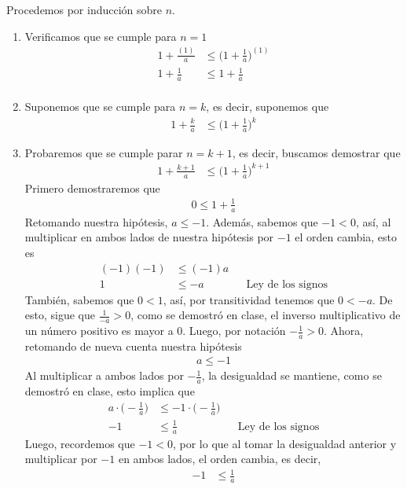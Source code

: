 \documentclass[11pt]{article}
\begin{document}
\begin{enumerate}
Procedemos por inducción sobre $n$. \begin{enumerate}[label=\roman*)]
 \item Verificamos que se cumple para $n=1$ \begin{align*}
  1+\frac{(1)}{a} &\leq \biggl(1+\frac{1}{a}\biggr)^{(1)} \\
  1+\frac{1}{a} &\leq 1+\frac{1}{a} \\
 \end{align*}
 \item Suponemos que se cumple para $n=k$, es decir, suponemos que \begin{align*}
  1+\frac{k}{a} &\leq \biggl(1+\frac{1}{a}\biggr)^k
 \end{align*}
 \item Probaremos que se cumple parar $n=k+1$, es decir, buscamos demostrar que \begin{align*}
  1+\frac{k+1}{a} &\leq \biggl(1+\frac{1}{a}\biggr)^{k+1}
 \end{align*}
 Primero demostraremos que \begin{align*}
  0 \leq 1+ \frac{1}{a}
 \end{align*} Retomando nuestra hipótesis, $a\leq -1$. Además, sabemos que $-1<0$, así, al multiplicar en ambos lados de nuestra hipótesis	por $-1$ el orden cambia, esto es \begin{align*}
  (-1)(-1) &\leq (-1) a \\
  1 &\leq -a && \text{Ley de los signos}
 \end{align*} También, sabemos que $0<1$, así, por transitividad tenemos que $0<-a$. De esto, sigue que $\frac{1}{-a}>0$, como se demostró en clase, el inverso multiplicativo de un número positivo es mayor a 0. Luego, por notación $-\frac{1}{a}>0$. Ahora, retomando de nueva cuenta nuestra hipótesis	\begin{align*}
  a\leq -1
 \end{align*} Al multiplicar a ambos lados por $-\frac{1}{a}$, la desigualdad se mantiene, como se demostró en clase, esto implica que \begin{align*}
  a \cdot \biggl(- \frac{1}{a}\biggr) &\leq -1 \cdot \biggl(- \frac{1}{a}\biggr)\\
  -1 &\leq \frac{1}{a} && \text{Ley de los signos}
 \end{align*} Luego, recordemos que $-1<0$, por lo que al tomar la desigualdad anterior y multiplicar por $-1$ en ambos lados, el orden cambia, es decir, \begin{align*}
  -1 &\leq \frac{1}{a} \\

\end{align*}
\end{enumerate}
\end{enumerate}
\end{document}
